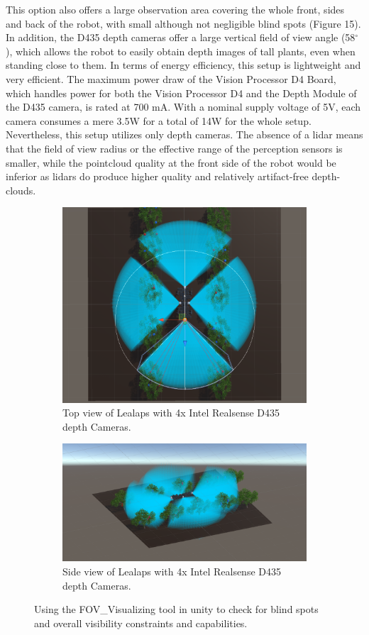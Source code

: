 \documentclass{article}
\begin{document}
\begin{enumerate}
This option also offers a large observation area covering the whole front, sides and back of the robot, with small although not negligible blind spots (Figure 15). In addition, the D435 depth cameras offer a large vertical field of view angle (58$^{\circ}$), which allows the robot to easily obtain depth images of tall plants, even when standing close to them. 
In terms of energy efficiency, this setup is lightweight and very efficient. The maximum power draw of the Vision Processor D4 Board, which handles power for both the Vision Processor D4 and the Depth Module of the D435 camera, is rated at 700 mA. With a nominal supply voltage of 5V, each camera consumes a mere 3.5W for a total of 14W for the whole setup. 
Nevertheless, this setup utilizes only depth cameras. The absence of a lidar means that the field of view radius or the effective range of the perception sensors is smaller, while the pointcloud quality at the front side of the robot would be inferior as lidars do produce higher quality and relatively artifact-free depth-clouds.

\begin{figure}
\centering
\begin{subfigure}[htbp]{1\textwidth}
   \centering
   \includegraphics[width=0.8\linewidth]{FOV(21).png}
   \caption{Top view of Lealaps with 4x Intel Realsense D435 depth Cameras.}
\end{subfigure}
\begin{subfigure}[htbp]{1\textwidth}
   \centering
   \includegraphics[width=0.8\linewidth]{FOV(22).png}
   \caption{Side view of Lealaps with 4x Intel Realsense D435 depth Cameras.}
\end{subfigure}
\caption[]{Using the FOV\_Visualizing tool in unity to check for blind spots and overall visibility constraints and capabilities.}
\end{figure}


\end{enumerate}
\end{document}

